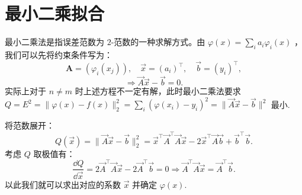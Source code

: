 \section{最小二乘拟合}
最小二乘法是指误差范数为 $2$-范数的一种求解方式。由 $\varphi(x) = \sum_i a_i \varphi_i(x)$ ，我们可以先将约束条件写为：
\[
    \mathbf{A} = (\varphi_i(x_j)),\quad \vec{x} = (a_i)^\top,\quad \vec{b} = (y_i)^\top,
\]
\[
    \Longrightarrow \vec{A}\vec{x} - \vec{b} = 0.
\]
实际上对于 $n\neq m$ 时上述方程不一定有解，此时最小二乘法要求 $Q =E^2 = \|\varphi(x)-f(x)\|_2^2 =  \sum_i (\varphi(x_i)-y_i)^2 = \|\vec{A}\vec{x}-\vec{b}\|^2$ 最小. 

将范数展开：
\[
    Q (\vec{x}) = \|\vec{A}\vec{x}-\vec{b}\|_2^2 = \vec{x}^\top \vec{A}^\top \vec{A}\vec{x}-2\vec{x}^\top \vec{A}\vec{b} +\vec{b}^\top \vec{b}.
\]
考虑 $Q$ 取极值有：
\[
    \dfrac{\dd Q}{\dd \vec{x}} = 2\vec{A}^\top \vec{A}\vec{x} - 2\vec{A}^\top \vec{b} = 0\Longrightarrow \vec{A}^\top \vec{A}\vec{x} = \vec{A}^\top \vec{b}.
\]
以此我们就可以求出对应的系数 $\vec{x}$ 并确定 $\varphi(x)$.
